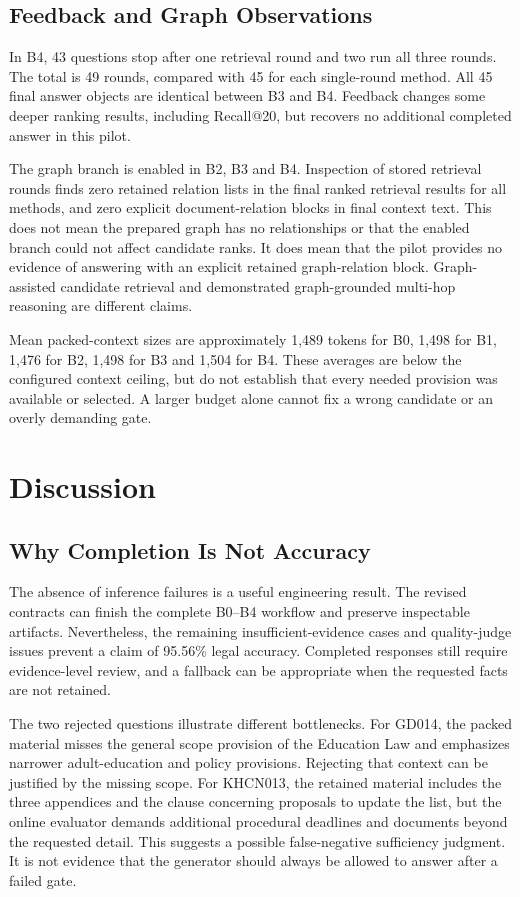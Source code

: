 \documentclass[11pt,a4paper,oneside]{report}
\begin{document}
\subsection{Feedback and Graph Observations}
In B4, 43 questions stop after one retrieval round and two run all three rounds. The total is 49 rounds, compared with 45 for each single-round method. All 45 final answer objects are identical between B3 and B4. Feedback changes some deeper ranking results, including Recall@20, but recovers no additional completed answer in this pilot.

The graph branch is enabled in B2, B3 and B4. Inspection of stored retrieval rounds finds zero retained relation lists in the final ranked retrieval results for all methods, and zero explicit document-relation blocks in final context text. This does not mean the prepared graph has no relationships or that the enabled branch could not affect candidate ranks. It does mean that the pilot provides no evidence of answering with an explicit retained graph-relation block. Graph-assisted candidate retrieval and demonstrated graph-grounded multi-hop reasoning are different claims.

Mean packed-context sizes are approximately 1,489 tokens for B0, 1,498 for B1, 1,476 for B2, 1,498 for B3 and 1,504 for B4. These averages are below the configured context ceiling, but do not establish that every needed provision was available or selected. A larger budget alone cannot fix a wrong candidate or an overly demanding gate.

\section{Discussion}
\subsection{Why Completion Is Not Accuracy}
The absence of inference failures is a useful engineering result. The revised contracts can finish the complete B0--B4 workflow and preserve inspectable artifacts. Nevertheless, the remaining insufficient-evidence cases and quality-judge issues prevent a claim of 95.56\% legal accuracy. Completed responses still require evidence-level review, and a fallback can be appropriate when the requested facts are not retained.

The two rejected questions illustrate different bottlenecks. For GD014, the packed material misses the general scope provision of the Education Law and emphasizes narrower adult-education and policy provisions. Rejecting that context can be justified by the missing scope. For KHCN013, the retained material includes the three appendices and the clause concerning proposals to update the list, but the online evaluator demands additional procedural deadlines and documents beyond the requested detail. This suggests a possible false-negative sufficiency judgment. It is not evidence that the generator should always be allowed to answer after a failed gate.
\end{document}
